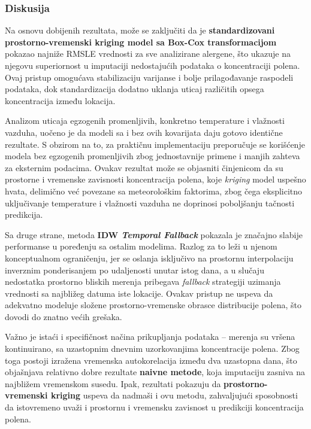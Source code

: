 \documentclass[12pt]{article}
\begin{document}
\subsubsection{Diskusija}

Na osnovu dobijenih rezultata, može se zaključiti da je \textbf{standardizovani prostorno-vremenski kriging model sa Box-Cox transformacijom} pokazao najniže RMSLE vrednosti za sve analizirane alergene, što ukazuje na njegovu superiornost u imputaciji nedostajućih podataka o koncentraciji polena. Ovaj pristup omogućava stabilizaciju varijanse i bolje prilagođavanje raspodeli podataka, dok standardizacija dodatno uklanja uticaj različitih opsega koncentracija između lokacija.

Analizom uticaja egzogenih promenljivih, konkretno temperature i vlažnosti vazduha, uočeno je da modeli sa i bez ovih kovarijata daju gotovo identične rezultate. S obzirom na to, za praktičnu implementaciju preporučuje se korišćenje modela bez egzogenih promenljivih zbog jednostavnije primene i manjih zahteva za eksternim podacima. Ovakav rezultat može se objasniti činjenicom da su prostorne i vremenske zavisnosti koncentracija polena, koje \textit{kriging} model uspešno hvata, delimično već povezane sa meteorološkim faktorima, zbog čega eksplicitno uključivanje temperature i vlažnosti vazduha ne doprinosi poboljšanju tačnosti predikcija.

Sa druge strane, metoda \textbf{IDW \textit{Temporal Fallback}} pokazala je značajno slabije performanse u poređenju sa ostalim modelima. Razlog za to leži u njenom konceptualnom ograničenju, jer se oslanja isključivo na prostornu interpolaciju inverznim ponderisanjem po udaljenosti unutar istog dana, a u slučaju nedostatka prostorno bliskih merenja pribegava \textit{fallback} strategiji uzimanja vrednosti sa najbližeg datuma iste lokacije. Ovakav pristup ne uspeva da adekvatno modeluje složene prostorno-vremenske obrasce distribucije polena, što dovodi do znatno većih grešaka.

Važno je istaći i specifičnost načina prikupljanja podataka – merenja su vršena kontinuirano, sa uzastopnim dnevnim uzorkovanjima koncentracije polena. Zbog toga postoji izražena vremenska autokorelacija između dva uzastopna dana, što objašnjava relativno dobre rezultate \textbf{naivne metode}, koja imputaciju zasniva na najbližem vremenskom susedu. Ipak, rezultati pokazuju da \textbf{prostorno-vremenski kriging} uspeva da nadmaši i ovu metodu, zahvaljujući sposobnosti da istovremeno uvaži i prostornu i vremensku zavisnost u predikciji koncentracija polena.
\end{document}
